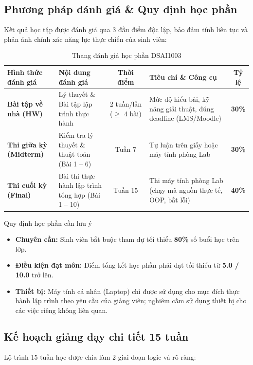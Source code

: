 \documentclass[11pt,a4paper]{article}
\begin{document}
\subsection{Phương pháp đánh giá \& Quy định học phần}
Kết quả học tập được đánh giá qua 3 đầu điểm độc lập, bảo đảm tính liên tục và phản ánh chính xác năng lực thực chiến của sinh viên:

\begin{table}[htbp]
\centering
\small
\begin{tabularx}{\textwidth}{@{}l X c p{4.2cm} c@{}}
\toprule
\textbf{Hình thức đánh giá} & \textbf{Nội dung đánh giá} & \textbf{Thời điểm} & \textbf{Tiêu chí \& Công cụ} & \textbf{Tỷ lệ} \\
\midrule
\textbf{Bài tập về nhà (HW)} & Lý thuyết \& Bài tập lập trình thực hành & 2 tuần/lần ($\ge$ 4 bài) & Mức độ hiểu bài, kỹ năng giải thuật, đúng deadline (LMS/Moodle) & \textbf{30\%} \\
\textbf{Thi giữa kỳ (Midterm)} & Kiểm tra lý thuyết \& thuật toán (Bài 1 -- 6) & Tuần 7 & Tự luận trên giấy hoặc máy tính phòng Lab & \textbf{30\%} \\
\textbf{Thi cuối kỳ (Final)} & Bài thi thực hành lập trình tổng hợp (Bài 1 -- 10) & Tuần 15 & Thi máy tính phòng Lab (chạy mã nguồn thực tế, OOP, bắt lỗi) & \textbf{40\%} \\
\bottomrule
\end{tabularx}
\caption{Thang đánh giá học phần DSAI1003}
\end{table}

\begin{warningbox}{Quy định học phần cần lưu ý}
\begin{itemize}[leftmargin=1.5em, itemsep=2pt]
    \item \textbf{Chuyên cần:} Sinh viên bắt buộc tham dự tối thiểu \textbf{80\%} số buổi học trên lớp.
    \item \textbf{Điều kiện đạt môn:} Điểm tổng kết học phần phải đạt tối thiểu từ \textbf{5.0 / 10.0} trở lên.
    \item \textbf{Thiết bị:} Máy tính cá nhân (Laptop) chỉ được sử dụng cho mục đích thực hành lập trình theo yêu cầu của giảng viên; nghiêm cấm sử dụng thiết bị cho các việc riêng không liên quan.
\end{itemize}
\end{warningbox}

\subsection{Kế hoạch giảng dạy chi tiết 15 tuần}
Lộ trình 15 tuần học được chia làm 2 giai đoạn logic và rõ ràng:
\end{document}
